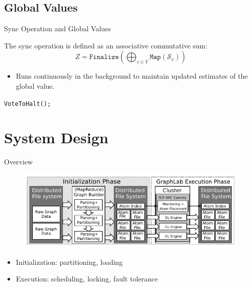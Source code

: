\documentclass[onlymath,xcolor=pdftex,dvipsnames,table]{beamer}
\theoremstyle{remark} %
\begin{document}
\subsection{Global Values}
\begin{frame}{Sync Operation and Global Values}
\begin{definition}
The sync operation is defined as an associative commutative sum:
$$Z=\texttt{Finalize}\left(\bigoplus_{v\in V}\texttt{Map}(\mathcal{S}_v)\right)$$
\end{definition}
\begin{itemize}
  \item Runs continuously in the background to maintain updated estimates of the global value.
\end{itemize}
\begin{example}
\texttt{VoteToHalt();}
\end{example}
\end{frame}

\section{System Design}
\begin{frame}{Overview}
\begin{figure}
  \centering
  \includegraphics[width=\textwidth]{distgloverview.pdf}
\end{figure}
\begin{itemize}
  \item Initialization: partitioning, loading
  \item Execution: scheduling, locking, fault tolerance
\end{itemize}
\end{frame}

\end{document}
